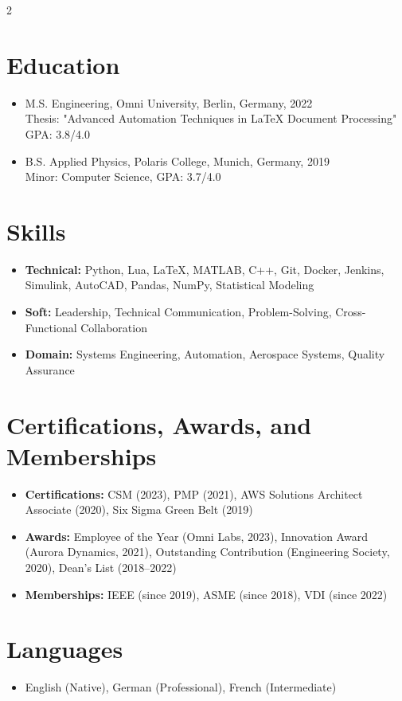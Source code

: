 \documentclass[
    language=english,
    doctype=cv,
    institution=none,
    titlestyle=simple
]{../../omnilatex}
\begin{document}
\begin{multicols}{2}
    \section{Education}
    \begin{itemize}
        \item M.S. Engineering, Omni University, Berlin, Germany, 2022 \\
              Thesis: "Advanced Automation Techniques in LaTeX Document Processing" \\
              GPA: 3.8/4.0
        \item B.S. Applied Physics, Polaris College, Munich, Germany, 2019 \\
              Minor: Computer Science, GPA: 3.7/4.0
    \end{itemize}

    \section{Skills}
    \begin{itemize}
        \item \textbf{Technical:} Python, Lua, LaTeX, MATLAB, C++, Git, Docker, Jenkins, Simulink, AutoCAD, Pandas, NumPy, Statistical Modeling
        \item \textbf{Soft:} Leadership, Technical Communication, Problem-Solving, Cross-Functional Collaboration
        \item \textbf{Domain:} Systems Engineering, Automation, Aerospace Systems, Quality Assurance
    \end{itemize}

    \section{Certifications, Awards, and Memberships}
    \begin{itemize}
        \item \textbf{Certifications:} CSM (2023), PMP (2021), AWS Solutions Architect Associate (2020), Six Sigma Green Belt (2019)
        \item \textbf{Awards:} Employee of the Year (Omni Labs, 2023), Innovation Award (Aurora Dynamics, 2021), Outstanding Contribution (Engineering Society, 2020), Dean's List (2018--2022)
        \item \textbf{Memberships:} IEEE (since 2019), ASME (since 2018), VDI (since 2022)
    \end{itemize}

    \section{Languages}
    \begin{itemize}
        \item English (Native), German (Professional), French (Intermediate)
    \end{itemize}


\end{multicols}
\end{document}
